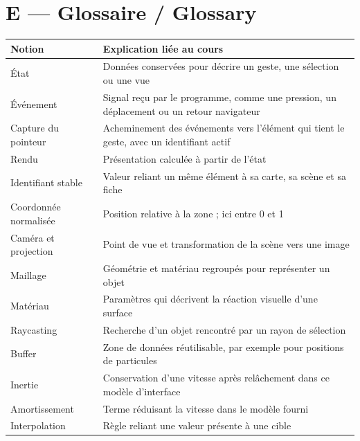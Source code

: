 \documentclass[
  canadien,
  11pt,
  a4paper,
]{report}
\newcounter{none} %
\begin{document}
\section{E --- Glossaire / Glossary}\label{e-glossaire-glossary}

{\def\LTcaptype{none} %
\begin{longtable}[]{@{}
  >{\raggedright\arraybackslash}p{}
  >{\raggedright\arraybackslash}p{}@{}}
\toprule\noalign{}
\begin{minipage}[b]{\linewidth}\raggedright
Notion
\end{minipage} & \begin{minipage}[b]{\linewidth}\raggedright
Explication liée au cours
\end{minipage} \\
\midrule\noalign{}
\endhead
\bottomrule\noalign{}
\endlastfoot
État & Données conservées pour décrire un geste, une sélection ou une
vue \\
Événement & Signal reçu par le programme, comme une pression, un
déplacement ou un retour navigateur \\
Capture du pointeur & Acheminement des événements vers l'élément qui
tient le geste, avec un identifiant actif \\
Rendu & Présentation calculée à partir de l'état \\
Identifiant stable & Valeur reliant un même élément à sa carte, sa scène
et sa fiche \\
Coordonnée normalisée & Position relative à la zone ; ici entre 0 et
1 \\
Caméra et projection & Point de vue et transformation de la scène vers
une image \\
Maillage & Géométrie et matériau regroupés pour représenter un objet \\
Matériau & Paramètres qui décrivent la réaction visuelle d'une
surface \\
Raycasting & Recherche d'un objet rencontré par un rayon de sélection \\
Buffer & Zone de données réutilisable, par exemple pour positions de
particules \\
Inertie & Conservation d'une vitesse après relâchement dans ce modèle
d'interface \\
Amortissement & Terme réduisant la vitesse dans le modèle fourni \\
Interpolation & Règle reliant une valeur présente à une cible \\

\end{longtable}}
\end{document}
